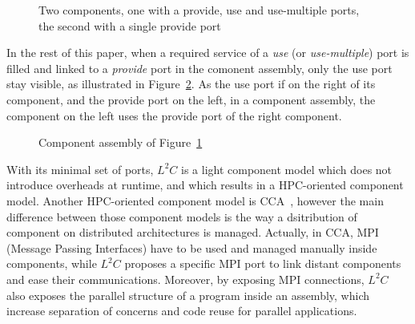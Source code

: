 \begin{figure}[h!]
\begin{center}
\caption{Two components, one with a provide, use and use-multiple ports, the second with a single provide port}
\label{fig:ports}
\end{center}
\end{figure}

In the rest of this paper, when a required service of a \emph{use} (or \emph{use-multiple}) port is filled and linked to a \emph{provide} port in the comonent assembly, only the use port stay visible, as illustrated in Figure~\ref{fig:assembly}. As the use port if on the right of its component, and the provide port on the left, in a component assembly, the component on the left uses the provide port of the right component.

\begin{figure}[h!]
\begin{center}
\caption{Component assembly of Figure~\ref{fig:ports}}
\label{fig:assembly}
\end{center}
\end{figure}

With its minimal set of ports, $L^2C$ is a light component model which does not introduce overheads at runtime, and which results in a HPC-oriented component model. Another HPC-oriented component model is CCA~\cite{Armstrong:1999:TCC:822084.823232}, however the main difference between those component models is the way a dsitribution of component on distributed architectures is managed. Actually, in CCA, MPI~\cite{Graham2009MSE} (Message Passing Interfaces) have to be used and managed manually inside components, while $L^2C$ proposes a specific MPI port to link distant components and ease their communications. Moreover, by exposing MPI connections, $L^2C$ also exposes the parallel structure of a program inside an assembly, which increase separation of concerns and code reuse for parallel applications.

